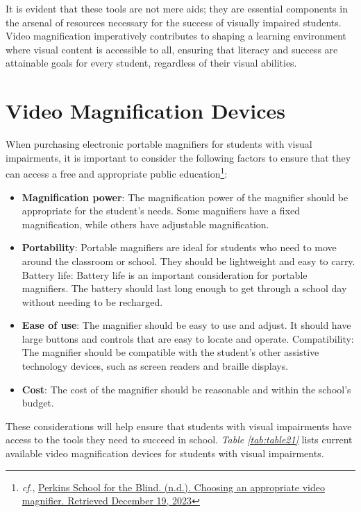 It is evident that these tools are not mere aids; they are essential components in the arsenal of resources necessary for the success of visually impaired students. Video magnification imperatively contributes to shaping a learning environment where visual content is accessible to all, ensuring that literacy and success are attainable goals for every student, regardless of their visual abilities.


\pagebreak\hypertarget{video-magnification-devices}{}\section{Video Magnification
 Devices}\label{video-magnification-devices}
When purchasing electronic portable magnifiers for students with visual impairments, it is important to consider the following factors to ensure that they can access a free and appropriate public education\footnote{\raggedright \textit{cf}., \href{http://www.perkins.org/resource/choosing-appropriate-video-magnifier/}{Perkins School for the Blind. (n.d.). Choosing an appropriate video magnifier. Retrieved December 19, 2023}}:
\begin{itemize}[leftmargin=*]
 \item \textbf{Magnification power}: The magnification power of the magnifier should be appropriate for the student’s needs. Some magnifiers have a fixed magnification, while others have adjustable magnification.
 \item \textbf{Portability}: Portable magnifiers are ideal for students who need to move around the classroom or school. They should be lightweight and easy to carry.
 Battery life: Battery life is an important consideration for portable magnifiers. The battery should last long enough to get through a school day without needing to be recharged.
 \item \textbf{Ease of use}: The magnifier should be easy to use and adjust. It should have large buttons and controls that are easy to locate and operate.
 Compatibility: The magnifier should be compatible with the student’s other assistive technology devices, such as screen readers and braille displays.
 \item \textbf{Cost}: The cost of the magnifier should be reasonable and within the school’s budget.
\end{itemize}
These considerations will help ensure that students with visual impairments have access to the tools they need to succeed in school. \textit{Table \ref{tab:table21}} lists current available video magnification devices for students with visual impairments.
 
